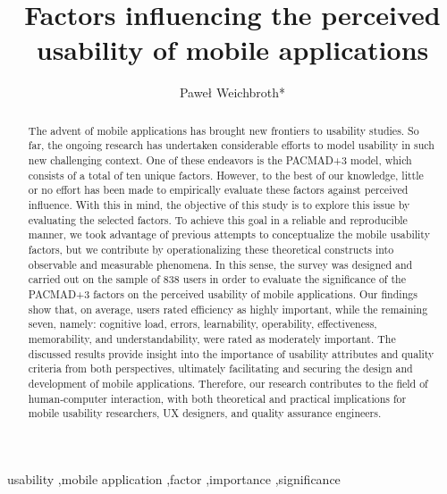 \documentclass[preprint,12pt]{elsarticle}
\begin{document}
\begin{frontmatter}

\title{Factors influencing the perceived usability of mobile applications}
\author[inst1]{Paweł Weichbroth*}

\begin{abstract}
The advent of mobile applications has brought new frontiers to usability studies. So far, the ongoing research has undertaken considerable efforts to model usability in such new challenging context. One of these endeavors is the PACMAD+3 model, which consists of a total of ten unique factors. However, to the best of our knowledge, little or no effort has been made to empirically evaluate these factors against perceived influence. With this in mind, the objective of this study is to explore this issue by evaluating the selected factors. To achieve this goal in a reliable and reproducible manner, we took advantage of previous attempts to conceptualize the mobile usability factors, but we contribute by operationalizing these theoretical constructs into observable and measurable phenomena. In this sense, the survey was designed and carried out on the sample of 838 users in order to evaluate the significance of the PACMAD+3 factors on the perceived usability of mobile applications. Our findings show that, on average, users rated efficiency as highly important, while the remaining seven, namely: cognitive load, errors, learnability, operability, effectiveness, memorability, and understandability, were rated as moderately important. The discussed results provide insight into the importance of usability attributes and quality criteria from both perspectives, ultimately facilitating and securing the design and development of mobile applications. Therefore, our research contributes to the field of human-computer interaction, with both theoretical and practical implications for mobile usability researchers, UX designers, and quality assurance engineers.
\end{abstract}

\begin{keyword}
usability \sep mobile application \sep factor \sep importance \sep significance
\end{keyword}

\end{frontmatter}
\end{document}
